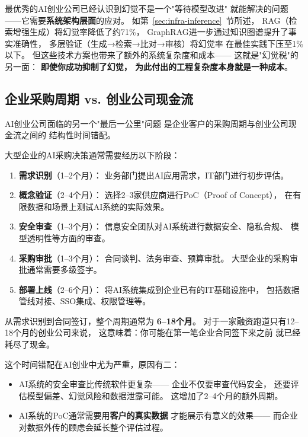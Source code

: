 最优秀的AI创业公司已经认识到幻觉不是一个"等待模型改进"
就能解决的问题——它需要\textbf{系统架构层面}的应对。
如第~\ref{sec:infra-inference}~节所述，
RAG（检索增强生成）将幻觉率降低了约71\%，
GraphRAG进一步通过知识图谱提升了事实准确性，
多层验证（生成→检索→比对→审核）将幻觉率
在最佳实践下压至1\%以下。
但这些技术方案也带来了额外的系统复杂度和成本——
这就是"幻觉税"的另一面：
\textbf{即使你成功抑制了幻觉，
为此付出的工程复杂度本身就是一种成本}。


\subsection{企业采购周期 vs. 创业公司现金流}

AI创业公司面临的另一个"最后一公里"问题
是企业客户的采购周期与创业公司现金流之间的
结构性时间错配。

大型企业的AI采购决策通常需要经历以下阶段：
\begin{enumerate}
  \item \textbf{需求识别}（1--2个月）：
    业务部门提出AI应用需求，IT部门进行初步评估。
  \item \textbf{概念验证}（2--4个月）：
    选择2--3家供应商进行PoC（Proof of Concept），
    在有限数据和场景上测试AI系统的实际效果。
  \item \textbf{安全审查}（1--3个月）：
    信息安全团队对AI系统进行数据安全、隐私合规、
    模型透明性等方面的审查。
  \item \textbf{采购审批}（1--3个月）：
    合同谈判、法务审查、预算审批。
    大型企业的采购审批通常需要多级签字。
  \item \textbf{部署上线}（2--6个月）：
    将AI系统集成到企业已有的IT基础设施中，
    包括数据管线对接、SSO集成、权限管理等。
\end{enumerate}

从需求识别到合同签订，整个周期通常为
\textbf{6--18个月}。
对于一家融资跑道只有12--18个月的创业公司来说，
这意味着：你可能在第一笔企业合同签下来之前
就已经耗尽了现金。

这个时间错配在AI创业中尤为严重，原因有二：
\begin{itemize}
  \item AI系统的安全审查比传统软件更复杂——
    企业不仅要审查代码安全，
    还要评估模型偏差、幻觉风险和数据泄露可能。
    这增加了2--4个月的额外周期。
  \item AI系统的PoC通常需要用\textbf{客户的真实数据}
    才能展示有意义的效果——
    而企业对数据外传的顾虑会延长整个评估过程。
\end{itemize}

